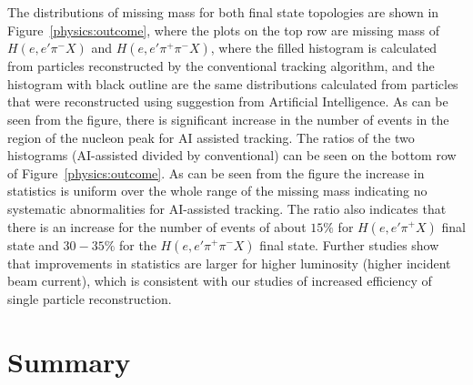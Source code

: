 The distributions of missing mass for both final state topologies are shown in Figure~\ref{physics:outcome}, where the plots 
on the top row are missing mass of $H(e,e'\pi^-X)$ and $H(e,e'\pi^+\pi^-X)$, where the filled histogram is calculated from 
particles reconstructed by the conventional tracking algorithm, and the histogram with black outline are the same distributions 
calculated from particles that were reconstructed using suggestion from Artificial Intelligence. As can be seen from the figure, 
there is significant increase in the number of events in the region of the nucleon peak for AI assisted
tracking. The ratios of the two histograms (AI-assisted divided by conventional) can be seen on the bottom row of 
Figure~\ref{physics:outcome}. As can be seen from the figure the increase in statistics is uniform over the whole range of the 
missing mass indicating no systematic abnormalities for AI-assisted tracking. The ratio also indicates that there is an increase 
for the number of events of about $15\%$ for $H(e,e'\pi^+X)$ final state and $30-35\%$ for the $H(e,e'\pi^+\pi^-X)$
final state. Further studies show that improvements in statistics are larger for higher luminosity (higher incident beam current), 
which is consistent with our studies of increased efficiency of single particle reconstruction.

\section{Summary}

